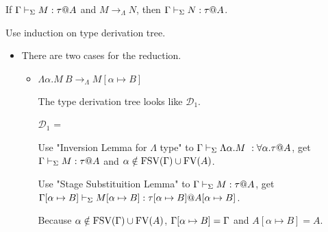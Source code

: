 \begin{theorem}
	If $\G\V M:\tau@A$ and $M \longrightarrow_{\Lambda} N$, then $\G\V N:\tau@A$.
\end{theorem}
	
Use induction on type derivation tree.
	
\begin{itemize}
	\newcommand{\R}{\longrightarrow_{\Lambda}}
	\item \TIns
	      	      	      	      	      	      	      	      		      	      	      	      
	      There are two cases for the reduction.
	      \begin{itemize}
	      	\item $\Lambda\alpha.M\ B \R M[\alpha \mapsto B]$
	      	      	      	      	      	      	      	      	      	      	      	      	      	      	      	      		      	      	      	      	      	      	      	      
	      	      The type derivation tree looks like $\mathcal{D}_1$.
	      	      	      	      	      	      	      	      	      	      	      	      	      	      	      	      		      	      	      	      	      	      	      	      
	      	      $\mathcal{D}_1$ = 
	      	      {}
	      	      	      	      	      	      	      	      	      	      	      	      	      	      	      	      		      	      	      	      	      	      	      	      
	      	      Use "Inversion Lemma for $\Lambda$ type" to $\Gamma \vdash_\Sigma \Lambda\alpha.M\ : \forall\alpha.\tau @ A$,
	      	      get $\Gamma \vdash_\Sigma M : \tau @ A$ and $\alpha \notin \text{FSV}(\Gamma) \cup \text{FV}(A)$.
	      	      	      	      	      	      	      	      	      	      	      	      	      	      	      	      		      	      	      	      	      	      	      	      
	      	      Use "Stage Substituition Lemma" to $\Gamma \vdash_\Sigma M : \tau @ A$,
	      	      get $\Gamma[\alpha \mapsto B] \vdash_\Sigma M[\alpha \mapsto B] : \tau[\alpha \mapsto B] @ A[\alpha \mapsto B]$.
	      	      	      	      	      	      	      	      	      	      	      	      	      	      	      	      		      	      	      	      	      	      	      	      
	      	      Because $\alpha \notin \text{FSV}(\Gamma) \cup \text{FV}(A)$, $\Gamma[\alpha \mapsto B] = \Gamma$ and $A[\alpha \mapsto B] = A$.
	      	      	      	      	      	      	      	      	      	      	      	      	      	      	      	      		      	      	      	      	      	      	      	      

\end{itemize}
\end{itemize}
